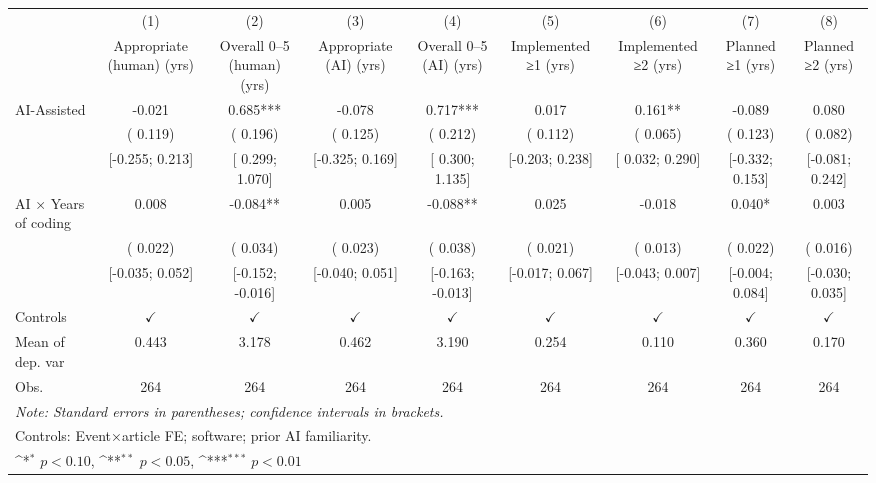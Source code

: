 \def\sym#1{\ifmmode^{#1}\else\(^{#1}\)\fi}
\begin{tabular}{l*{8}{c}}
\hline\hline
 & (1) & (2) & (3) & (4) & (5) & (6) & (7) & (8)
\\
 & Appropriate (human) (yrs) & Overall 0–5 (human) (yrs) & Appropriate (AI) (yrs) & Overall 0–5 (AI) (yrs) & Implemented ≥1 (yrs) & Implemented ≥2 (yrs) & Planned ≥1 (yrs) & Planned ≥2 (yrs)
 \\
\hline
AI-Assisted & -0.021 &  0.685*** & -0.078 &  0.717*** &  0.017 &  0.161** & -0.089 &  0.080
\\
 & ( 0.119) & ( 0.196) & ( 0.125) & ( 0.212) & ( 0.112) & ( 0.065) & ( 0.123) & ( 0.082)
\\
 & [-0.255;  0.213] & [ 0.299;  1.070] & [-0.325;  0.169] & [ 0.300;  1.135] & [-0.203;  0.238] & [ 0.032;  0.290] & [-0.332;  0.153] & [-0.081;  0.242]
\\
AI × Years of coding &  0.008 & -0.084** &  0.005 & -0.088** &  0.025 & -0.018 &  0.040* &  0.003
\\
 & ( 0.022) & ( 0.034) & ( 0.023) & ( 0.038) & ( 0.021) & ( 0.013) & ( 0.022) & ( 0.016)
\\
 & [-0.035;  0.052] & [-0.152; -0.016] & [-0.040;  0.051] & [-0.163; -0.013] & [-0.017;  0.067] & [-0.043;  0.007] & [-0.004;  0.084] & [-0.030;  0.035]
\\
\hline
Controls & $\checkmark$ & $\checkmark$ & $\checkmark$ & $\checkmark$ & $\checkmark$ & $\checkmark$ & $\checkmark$ & $\checkmark$
\\
Mean of dep. var &  0.443 &  3.178 &  0.462 &  3.190 &  0.254 &  0.110 &  0.360 &  0.170
\\
Obs. & 264 & 264 & 264 & 264 & 264 & 264 & 264 & 264
\\
\hline
\hline\hline
\multicolumn{9}{l}{\it{Note:} Standard errors in parentheses; confidence intervals in brackets.}\\
\multicolumn{9}{l}{Controls: Event×article FE; software; prior AI familiarity.}\\
\multicolumn{9}{l}{\sym{*} $p<0.10$, \sym{**} $p<0.05$,  \sym{***} $p<0.01$}\\
\end{tabular}
